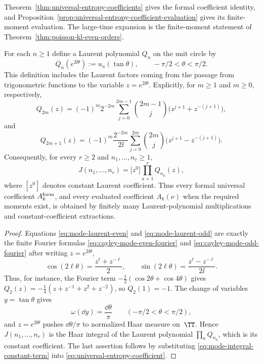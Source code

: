 Theorem~\ref{thm:universal-entropy-coefficients} gives the formal coefficient
identity, and
Proposition~\ref{prop:universal-entropy-coefficient-evaluation} gives its
finite-moment evaluation.  The large-time expansion is the finite-moment
statement of Theorem~\ref{thm:poisson-kl-even-orders}.

\begin{theorem}%
\label{thm:finite-fourier-mode-integral-algorithm}
For each $n\ge1$ define a Laurent polynomial $Q_n$ on the unit circle by
\begin{equation}\label{eq:mode-laurent-polynomial-definition}
Q_n(e^{2\ii\theta}):=u_n(\tan\theta),
\qquad -\pi/2<\theta<\pi/2.
\end{equation}
This definition includes the Laurent factors coming from the passage from
trigonometric functions to the variable \(z=e^{2\ii\theta}\).
Explicitly, for $m\ge1$ and $m\ge0$, respectively,
\begin{equation}\label{eq:mode-laurent-even}
Q_{2m}(z)=(-1)^m2^{-2m}
\sum_{j=0}^{2m-1}\binom{2m-1}{j}
\bigl(z^{j+1}+z^{-(j+1)}\bigr),
\end{equation}
and
\begin{equation}\label{eq:mode-laurent-odd}
Q_{2m+1}(z)=(-1)^m\frac{2^{-2m}}{2\ii}
\sum_{j=0}^{2m}\binom{2m}{j}
\bigl(z^{j+1}-z^{-(j+1)}\bigr).
\end{equation}
Consequently, for every $r\ge2$ and $n_1,\dots,n_r\ge1$,
\begin{equation}\label{eq:mode-integral-constant-term}
J(n_1,\dots,n_r)
=\bigl[z^0\bigr]\prod_{a=1}^{r}Q_{n_a}(z),
\end{equation}
where $[z^0]$ denotes constant Laurent coefficient.  Thus every formal
universal coefficient $A_k^{\rm form}$, and every evaluated coefficient
$A_k(\nu)$ when the required moments exist, is obtained by finitely many
Laurent-polynomial multiplications and constant-coefficient extractions.
\end{theorem}

\begin{proof}
Equations \eqref{eq:mode-laurent-even} and \eqref{eq:mode-laurent-odd} are
exactly the finite Fourier formulas
\eqref{eq:cayley-mode-even-fourier} and
\eqref{eq:cayley-mode-odd-fourier} after writing
$z=e^{2\ii\theta}$,
\[
\cos(2\ell\theta)=\frac{z^\ell+z^{-\ell}}2,
\qquad
\sin(2\ell\theta)=\frac{z^\ell-z^{-\ell}}{2\ii}.
\]
Thus, for instance, the Fourier term
\(-\frac12(\cos2\theta+\cos4\theta)\) gives
\(Q_2(z)=-\frac14(z+z^{-1}+z^2+z^{-2})\), so \(Q_2(1)=-1\).
The change of variables $y=\tan\theta$ gives
\[
\omega(\dd y)=\frac{\dd\theta}{\pi}
\qquad(-\pi/2<\theta<\pi/2),
\]
and $z=e^{2\ii\theta}$ pushes $\dd\theta/\pi$ to normalized Haar measure
on~$\TT$.  Hence $J(n_1,\dots,n_r)$ is the Haar integral of the Laurent
polynomial $\prod_a Q_{n_a}$, which is its constant coefficient.  The last
assertion follows by substituting
\eqref{eq:mode-integral-constant-term} into
\eqref{eq:universal-entropy-coefficient}.
\end{proof}

